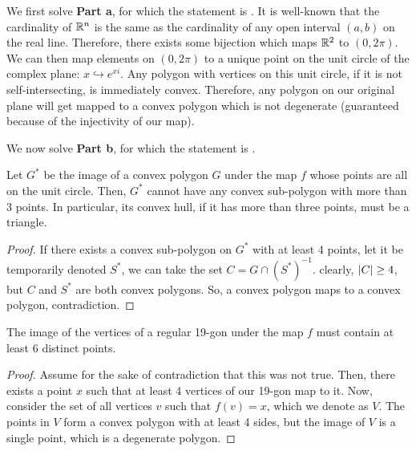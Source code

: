 \documentclass[10pt]{../usamts}
\begin{document}
\begin{solution}

We first solve \textbf{Part a}, for which the statement is . It is well-known that the cardinality of $\mathbb{R}^n$ is the same as the cardinality of any open interval $(a,b)$ on the real line. Therefore, there exists some bijection which maps $\mathbb{R}^2$ to $(0,2\pi)$. We can then map elements on $(0,2\pi)$ to a unique point on the unit circle of the complex plane: $x \hookrightarrow e^{xi}$. Any polygon with vertices on this unit circle, if it is not self-intersecting, is immediately convex. Therefore, any polygon on our original plane will get mapped to a convex polygon which is not degenerate (guaranteed because of the injectivity of our map). 

We now solve \textbf{Part b}, for which the statement is .
\begin{claim}
    Let $G^*$ be the image of a convex polygon $G$ under the map $f$ whose points are all on the unit circle. Then, $G^*$ cannot have any convex sub-polygon with more than 3 points. In particular, its convex hull, if it has more than three points, must be a triangle.
\end{claim}
\begin{proof}
    If there exists a convex sub-polygon on $G^*$ with at least 4 points, let it be temporarily denoted $S^*$, we can take the set $C = G \cap (S^*)^{-1}$. clearly, $\left| C \right| \geq 4$, but $C$ and $S^*$ are both convex polygons. So, a convex polygon maps to a convex polygon, contradiction.
\end{proof}

\begin{claim}
    The image of the vertices of a regular 19-gon under the map $f$ must contain at least 6 distinct points.
\end{claim}
\begin{proof}
    Assume for the sake of contradiction that this was not true. Then, there exists a point $x$ such that at least 4 vertices of our 19-gon map to it. Now, consider the set of all vertices $v$ such that $f(v) = x$, which we denote as $V$. The points in $V$ form a convex polygon with at least 4 sides, but the image of $V$ is a single point, which is a degenerate polygon.
\end{proof}


\end{solution}
\end{document}
